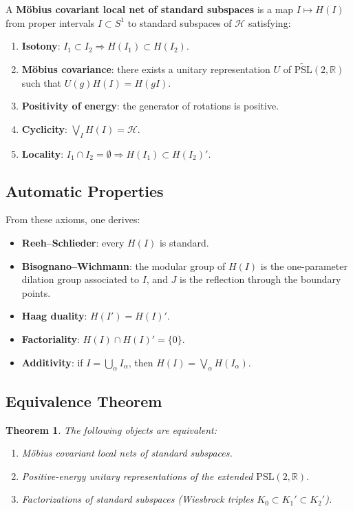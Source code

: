 \documentclass[11pt,a4paper]{article}
\newtheorem{theorem}{Theorem}[section]
\begin{document}
A \textbf{M\"obius covariant local net of standard subspaces} is a map
$I \mapsto H(I)$ from proper intervals $I \subset S^1$ to standard
subspaces of $\mathcal{H}$ satisfying:
\begin{enumerate}[nosep]
  \item \textbf{Isotony}: $I_1 \subset I_2 \Rightarrow H(I_1) \subset H(I_2)$.
  \item \textbf{M\"obius covariance}: there exists a unitary representation
        $U$ of $\widetilde{\mathrm{PSL}}(2,\mathbb{R})$ such that
        $U(g)H(I) = H(gI)$.
  \item \textbf{Positivity of energy}: the generator of rotations is positive.
  \item \textbf{Cyclicity}: $\bigvee_I H(I) = \mathcal{H}$.
  \item \textbf{Locality}: $I_1 \cap I_2 = \emptyset \Rightarrow
        H(I_1) \subset H(I_2)'$.
\end{enumerate}

\subsection{Automatic Properties}

From these axioms, one derives:
\begin{itemize}[nosep]
  \item \textbf{Reeh--Schlieder}: every $H(I)$ is standard.
  \item \textbf{Bisognano--Wichmann}: the modular group of $H(I)$ is the
        one-parameter dilation group associated to $I$, and $J$ is the
        reflection through the boundary points.
  \item \textbf{Haag duality}: $H(I') = H(I)'$.
  \item \textbf{Factoriality}: $H(I) \cap H(I)' = \{0\}$.
  \item \textbf{Additivity}: if $I = \bigcup_\alpha I_\alpha$, then
        $H(I) = \bigvee_\alpha H(I_\alpha)$.
\end{itemize}

\subsection{Equivalence Theorem}

\begin{theorem}
The following objects are equivalent:
\begin{enumerate}[nosep]
  \item M\"obius covariant local nets of standard subspaces.
  \item Positive-energy unitary representations of the extended
        $\mathrm{PSL}(2,\mathbb{R})$.
  \item Factorizations of standard subspaces (Wiesbrock triples
        $K_0 \subset K_1' \subset K_2'$).
\end{enumerate}
\end{theorem}
\end{document}
